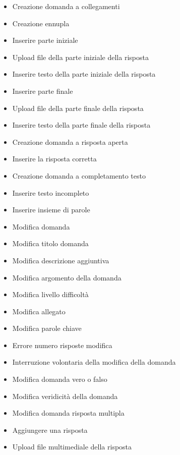 \begin{itemize}
	\item {} Creazione domanda a collegamenti 
	\item {} Creazione ennupla 
	\item {} Inserire parte iniziale 
	\item {} Upload file della parte iniziale della risposta 
	\item {} Inserire testo della parte iniziale della risposta 
	\item {} Inserire parte finale 
	\item {} Upload file della parte finale della risposta 
	\item {} Inserire testo della parte finale della risposta 
	\item {} Creazione domanda a risposta aperta 
	\item {} Inserire la risposta corretta 
	\item {} Creazione domanda a completamento testo 
	\item {} Inserire testo incompleto
	\item {} Inserire insieme di parole
	\item {} Modifica domanda 
	\item {} Modifica titolo domanda 
	\item {} Modifica descrizione aggiuntiva 
	\item {} Modifica argomento della domanda 
	\item {} Modifica livello difficoltà 
	\item {} Modifica allegato 
	\item {} Modifica parole chiave 
	\item {} Errore numero risposte modifica 
	\item {} Interruzione volontaria della modifica della domanda
	\item {} Modifica domanda vero o falso
	\item {} Modifica veridicità della domanda 
	\item {} Modifica domanda risposta multipla 
	\item {} Aggiungere una risposta
	\item {} Upload file multimediale della risposta

\end{itemize}

